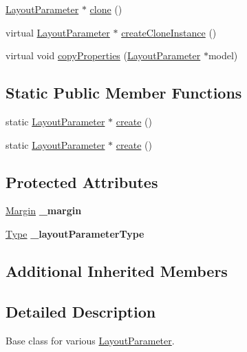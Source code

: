 \begin{DoxyCompactItemize}
\item 
\hyperlink{classui_1_1LayoutParameter}{Layout\+Parameter} $\ast$ \hyperlink{classui_1_1LayoutParameter_ac4c425f5ae7ac0c2fc207b6c6d772115}{clone} ()
\item 
virtual \hyperlink{classui_1_1LayoutParameter}{Layout\+Parameter} $\ast$ \hyperlink{classui_1_1LayoutParameter_a7b047d7ab5306ad9f49e2b065ffcee7a}{create\+Clone\+Instance} ()
\item 
virtual void \hyperlink{classui_1_1LayoutParameter_a59b36d5608cf7353dd5916ea331745a2}{copy\+Properties} (\hyperlink{classui_1_1LayoutParameter}{Layout\+Parameter} $\ast$model)
\end{DoxyCompactItemize}
\subsection*{Static Public Member Functions}
\begin{DoxyCompactItemize}
\item 
static \hyperlink{classui_1_1LayoutParameter}{Layout\+Parameter} $\ast$ \hyperlink{classui_1_1LayoutParameter_a2de6ed250036c47f60a16c17d3ba8de1}{create} ()
\item 
static \hyperlink{classui_1_1LayoutParameter}{Layout\+Parameter} $\ast$ \hyperlink{classui_1_1LayoutParameter_ae68b022ea4ef24037de724279a285428}{create} ()
\end{DoxyCompactItemize}
\subsection*{Protected Attributes}
\begin{DoxyCompactItemize}
\item 
\mbox{\label{classui_1_1LayoutParameter_a72b6881f0b69657c9a678005b447d2d2}} 
\hyperlink{classui_1_1Margin}{Margin} {\bfseries \+\_\+margin}
\item 
\mbox{\label{classui_1_1LayoutParameter_adb892e025037fbe43f42bde9e1739378}} 
\hyperlink{classui_1_1LayoutParameter_a1b01e01e7e6fc3de80f2e6d07fae806e}{Type} {\bfseries \+\_\+layout\+Parameter\+Type}
\end{DoxyCompactItemize}
\subsection*{Additional Inherited Members}


\subsection{Detailed Description}
Base class for various \hyperlink{classui_1_1LayoutParameter}{Layout\+Parameter}. 


